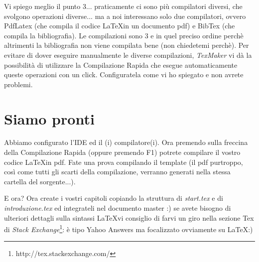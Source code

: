 Vi spiego meglio il punto 3... praticamente ci sono più compilatori diversi, che svolgono operazioni diverse... ma a noi interessano solo due compilatori, ovvero PdfLatex (che compila il codice \LaTeX in un documento pdf) e BibTex (che compila la bibliografia). Le compilazioni sono 3 e in quel preciso ordine perchè altrimenti la bibliografia non viene compilata bene (non chiedetemi perchè). Per evitare di dover eseguire manualmente le diverse compilazioni, \emph{TexMaker} vi dà la possibilità di utilizzare la Compilazione Rapida che esegue automaticamente queste operazioni con un click. Configuratela come vi ho spiegato e non avrete problemi.


\section{Siamo pronti}
\label{sec:pronti}

Abbiamo configurato l'IDE ed il (i) compilatore(i). Ora premendo sulla freccina della Compilazione Rapida (oppure premendo F1) potrete compilare il vostro codice \LaTeX in pdf. Fate una prova compilando il template (il pdf purtroppo, così come tutti gli scarti della compilazione, verranno generati nella stessa cartella del sorgente...).

E ora? Ora create i vostri capitoli copiando la struttura di \emph{start.tex} e di \emph{introduzione.tex} ed integrateli nel documento master :) se avete bisogno di ulteriori dettagli sulla sintassi \LaTeX vi consiglio di farvi un giro nella sezione Tex di \emph{Stack Exchange}\footnote{http://tex.stackexchange.com/}: è tipo Yahoo Answers ma focalizzato ovviamente su \LaTeX :)